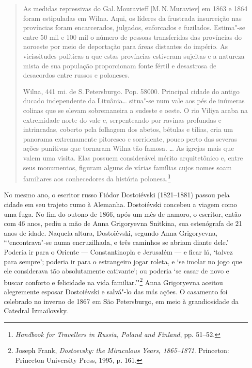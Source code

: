 \begin{quote}
As medidas repressivas do Gal.\,Mouravieff {[}M.\,N.\,Muraviev{]} em 1863 e
1864 foram estipuladas em Wilna. Aqui, os líderes da frustrada
insurreição nas províncias foram encarcerados, julgados, enforcados e
fuzilados. Estima"-se entre 50 mil e 100 mil o número de pessoas
transferidas das províncias do noroeste por meio de deportação para
áreas distantes do império. As vicissitudes políticas a que estas
províncias estiveram sujeitas e a natureza mista de sua população
proporcionam fonte fértil e desastrosa de desacordos entre russos e
poloneses.

%

Wilna, 441 mi. de S.\,Petersburgo. Pop. 58000. Principal cidade do antigo
ducado independente da Lituânia\ldots{} situa"-se num vale aos pés de
inúmeras colinas que se elevam sobremaneira a sudeste e oeste. O rio
Viliya acaba na extremidade norte do vale e, serpenteando por ravinas
profundas e intrincadas, coberto pela folhagem dos abetos, bétulas e
tílias, cria um panorama extremamente pitoresco e sorridente, pouco
perto das severas ações punitivas que tornaram Wilna tão famosa.
\ldots{} As igrejas mais que valem uma visita. Elas possuem considerável
mérito arquitetônico e, entre seus monumentos, figuram alguns de várias
famílias cujos nomes soam familiares aos conhecedores da história
polonesa.\footnote{\emph{Handbook for Travellers in Russia, Poland and
  Finland}, pp. 51--52.}
\end{quote}

No mesmo ano, o escritor russo Fiódor Dostoiévski (1821--1881) passou
pela cidade em seu trajeto rumo à Alemanha. Dostoiévski concebeu a
viagem como uma fuga. No fim do outono de 1866, após um mês de namoro, o
escritor, então com 46 anos, pediu a mão de Anna Grigoryevna Snitkina,
sua estenógrafa de 21 anos de idade. Naquela altura, Dostoiévski,
segundo Anna Grigoryevna, ```encontrava"-se numa encruzilhada, e três
caminhos se abriam diante dele.' Poderia ir para o Oriente ---
Constantinopla e Jerusalém --- e ficar lá, `talvez para sempre'; poderia
ir para o estrangeiro jogar roleta, e `se imolar no jogo que ele
considerava tão absolutamente cativante'; ou poderia `se casar de novo e
buscar conforto e felicidade na vida familiar.'"\footnote{Joseph Frank,
  \emph{Dostoevsky: the Miraculous Years, 1865--1871}. Princeton:
  Princeton University Press, 1995, p. 161.} Anna Grigoryevna aceitou
alegremente esposar Dostoiévski e salvá"-lo das más ações. O casamento
foi celebrado no inverno de 1867 em São Petersburgo, em meio à
grandiosidade da Catedral Izmailovsky.

